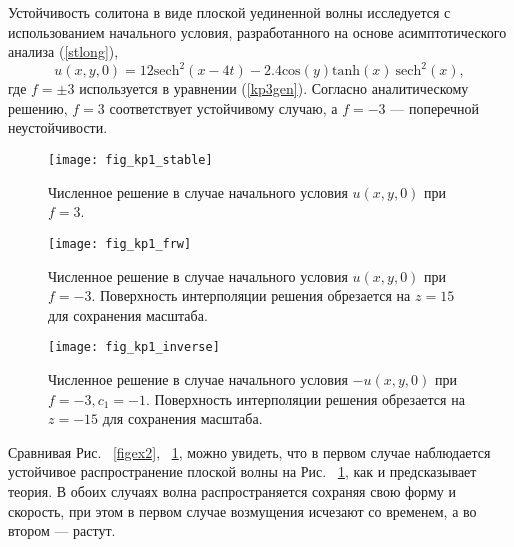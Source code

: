 Устойчивость солитона в виде плоской уединенной волны исследуется с использованием начального условия, разработанного на основе асимптотического анализа (\ref {stlong}),
\begin{equation}
	\label{kp1ex2}
	u(x,y,0)=12{\text{sech}}^2(x-4t) - 2.4 {\text{cos}} (y) {\text{tanh}} (x) ~{\text{sech}}^2(x),
\end{equation}
где $ f = \pm 3 $ используется в уравнении (\ref {kp3gen}). Согласно аналитическому решению, $ f = 3 $ соответствует устойчивому случаю, а $ f = -3 $ --- поперечной неустойчивости.
\begin{figure}
	\centering
	\texttt{[image: fig\_kp1\_stable]}
	\caption{Численное решение в случае начального условия $u(x,y,0)$ при $f=3$.}\label{figex3}	
\end{figure}
\begin{figure}
	\centering
	\texttt{[image: fig\_kp1\_frw]}
	\caption{Численное решение в случае начального условия $u(x,y,0)$ при $f=-3$. Поверхность интерполяции решения обрезается на $ z = 15 $ для сохранения масштаба.}\label{figex4}	
\end{figure}
\begin{figure}
	\centering
	\texttt{[image: fig\_kp1\_inverse]}
	\caption{Численное решение в случае начального условия $-u(x,y,0)$ при $f=-3, c_1=-1$. Поверхность интерполяции решения обрезается на $ z = -15 $ для сохранения масштаба.}\label{figex44}	
\end{figure}

Сравнивая Рис. ~\ref{figex2}, ~\ref{figex3}, можно увидеть, что в первом случае наблюдается устойчивое распространение плоской волны на Рис. ~\ref{figex3}, как и предсказывает теория. В обоих случаях волна распространяется сохраняя свою форму и скорость, при этом в первом случае возмущения исчезают со временем, а во втором --- растут.

